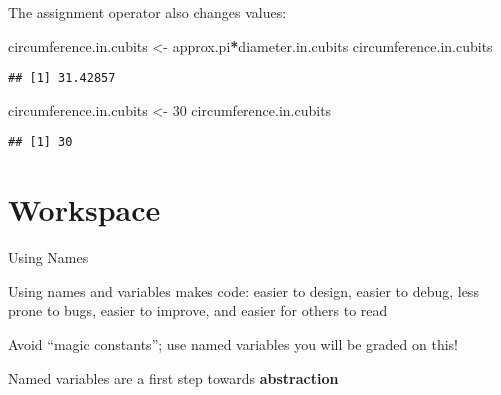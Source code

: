 \documentclass[8pt,ignorenonframetext,]{beamer}
\newenvironment{Shaded}{\begin{snugshade}}{\end{snugshade}}
\newcommand{\DecValTok}[1]{\textcolor[rgb]{0.00,0.00,0.81}{#1}}
\newcommand{\StringTok}[1]{\textcolor[rgb]{0.31,0.60,0.02}{#1}}
\newcommand{\OperatorTok}[1]{\textcolor[rgb]{0.81,0.36,0.00}{\textbf{#1}}}
\newcommand{\NormalTok}[1]{#1}
\begin{document}
\begin{frame}[fragile]{The assignment operator also changes values:}

\begin{Shaded}
\begin{Highlighting}[]
\NormalTok{circumference.in.cubits <-}\StringTok{ }\NormalTok{approx.pi}\OperatorTok{*}\NormalTok{diameter.in.cubits}
\NormalTok{circumference.in.cubits}
\end{Highlighting}
\end{Shaded}

\begin{verbatim}
## [1] 31.42857
\end{verbatim}

\begin{Shaded}
\begin{Highlighting}[]
\NormalTok{circumference.in.cubits <-}\StringTok{ }\DecValTok{30}
\NormalTok{circumference.in.cubits}
\end{Highlighting}
\end{Shaded}

\begin{verbatim}
## [1] 30
\end{verbatim}

\end{frame}

\section{Workspace}\label{workspace}

\begin{frame}{Using Names}

Using names and variables makes code: easier to design, easier to debug,
less prone to bugs, easier to improve, and easier for others to read

Avoid ``magic constants''; use named variables you will be graded on
this!

Named variables are a first step towards \textbf{abstraction}

\end{frame}
\end{document}
